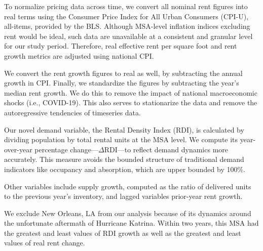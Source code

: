 \documentclass[APA,Times1COL]{WileyNJDv5} %
\begin{document}
To normalize pricing data across time, we convert all nominal rent figures into real terms using the Consumer Price Index for All Urban Consumers (CPI-U), all-items, provided by the BLS. Although MSA-level inflation indices excluding rent would be ideal, such data are unavailable at a consistent and granular level for our study period. Therefore, real effective rent per square foot and rent growth metrics are adjusted using national CPI. 

We convert the rent growth figures to real as well, by subtracting the annual growth in CPI. Finally, we standardize the figures by subtracting the year's median rent growth. We do this to remove the impact of national macroeconomic shocks (i.e., COVID-19). This also serves to stationarize the data and remove the autoregressive tendencies of timeseries data.

Our novel demand variable, the Rental Density Index (RDI), is calculated by dividing population by total rental units at the MSA level. We compute its year-over-year percentage change---\(\Delta\text{RDI}\)---to reflect demand dynamics more accurately. This measure avoids the bounded structure of traditional demand indicators like occupancy and absorption, which are upper bounded by 100\%.

Other variables include supply growth, computed as the ratio of delivered units to the previous year's inventory, and lagged variables prior-year rent growth. 

We exclude New Orleans, LA from our analysis because of its dynamics around the unfortunate aftermath of Hurricane Katrina. Within two years, this MSA had the greatest and least values of RDI growth as well as the greatest and least values of real rent change. 
\end{document}
